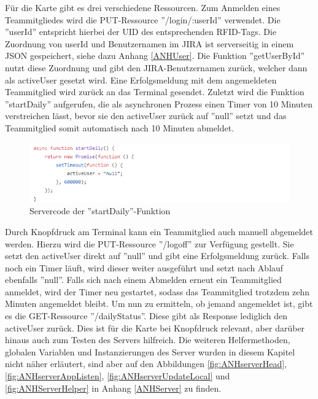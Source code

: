 \documentclass[12pt,titlepage]{scrartcl}
\begin{document}
			\noindent Für die Karte gibt es drei verschiedene Ressourcen. Zum Anmelden eines Teammitgliedes wird die PUT-Ressource ''/login/:userId'' verwendet. Die ''userId'' entspricht hierbei der UID des entsprechenden RFID-Tags. Die Zuordnung von userId und Benutzernamen im JIRA ist serverseitig in einem JSON gespeichert, siehe dazu Anhang \ref{ANHUser}. Die Funktion ''getUserById'' nutzt diese Zuordnung und gibt den JIRA-Benutzernamen zurück, welcher dann als activeUser gesetzt wird. Eine Erfolgsmeldung mit dem angemeldeten Teammitglied wird zurück an das Terminal gesendet. Zuletzt wird die Funktion ''startDaily'' aufgerufen, die als asynchronen Prozess einen Timer von 10 Minuten verstreichen lässt, bevor sie den activeUser zurück auf ''null'' setzt und das Teammitglied somit automatisch nach 10 Minuten abmeldet.
			\begin{figure}[H] 
  				\centering
    			\includegraphics[height=0.18\textheight]{serverStartDaily}
  				\caption{Servercode der ''startDaily''-Funktion}
  				\label{fig:serverStartDaily}
			\end{figure}
			\noindent Durch Knopfdruck am Terminal kann ein Teammitglied auch manuell abgemeldet werden. Hierzu wird die PUT-Ressource ''/logoff'' zur Verfügung gestellt. Sie setzt den activeUser direkt auf ''null'' und gibt eine Erfolgsmeldung zurück. Falls noch ein Timer läuft, wird dieser weiter ausgeführt und setzt nach Ablauf ebenfalls ''null''. Falls sich nach einem Abmelden erneut ein Teammitglied anmeldet, wird der Timer neu gestartet, sodass das Teammitglied trotzdem zehn Minuten angemeldet bleibt. Um nun zu ermitteln, ob jemand angemeldet ist, gibt es die GET-Ressource ''/dailyStatus''. Diese gibt als Response lediglich den activeUser zurück. Dies ist für die Karte bei Knopfdruck relevant, aber darüber hinaus auch zum Testen des Servers hilfreich. Die weiteren Helfermethoden, globalen Variablen und Instanzierungen des Server wurden in diesem Kapitel nicht näher erläutert, sind aber auf den Abbildungen \ref{fig:ANHserverHead}, \ref{fig:ANHserverAppListen}, \ref{fig:ANHserverUpdateLocal} und \ref{fig:ANHServerHelper} in Anhang \ref{ANHServer} zu finden.
\end{document}
